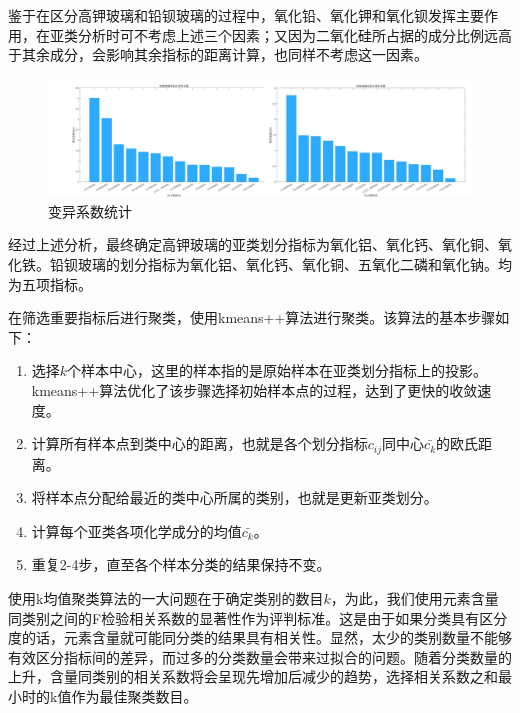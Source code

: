 \documentclass{my_paper}
\begin{document}
鉴于在区分高钾玻璃和铅钡玻璃的过程中，氧化铅、氧化钾和氧化钡发挥主要作用，在亚类分析时可不考虑上述三个因素；又因为二氧化硅所占据的成分比例远高于其余成分，会影响其余指标的距离计算，也同样不考虑这一因素。
\newpage
\begin {figure}[h]
\centering %
\includegraphics[width=\textwidth]{12.jpg}
\caption{变异系数统计} %
\label{cvpr}
\end {figure}
经过上述分析，最终确定高钾玻璃的亚类划分指标为氧化铝、氧化钙、氧化铜、氧化铁。铅钡玻璃的划分指标为氧化铝、氧化钙、氧化铜、五氧化二磷和氧化钠。均为五项指标。

在筛选重要指标后进行聚类，使用kmeans++算法\cite{10}进行聚类。该算法的基本步骤如下：
\begin{enumerate}
  \item 选择$k$个样本中心，这里的样本指的是原始样本在亚类划分指标上的投影。kmeans++算法优化了该步骤选择初始样本点的过程，达到了更快的收敛速度。\cite{11}
  \item 计算所有样本点到类中心的距离，也就是各个划分指标$c_{ij}$同中心$\bar{c_{k}}$的欧氏距离。
  \item 将样本点分配给最近的类中心所属的类别，也就是更新亚类划分。
  \item 计算每个亚类各项化学成分的均值$\bar{c_k}$。
  \item 重复2-4步，直至各个样本分类的结果保持不变。
\end{enumerate}

使用k均值聚类算法的一大问题在于确定类别的数目$k$，为此，我们使用元素含量同类别之间的F检验相关系数\cite{12}的显著性作为评判标准。这是由于如果分类具有区分度的话，元素含量就可能同分类的结果具有相关性。显然，太少的类别数量不能够有效区分指标间的差异，而过多的分类数量会带来过拟合的问题。随着分类数量的上升，含量同类别的相关系数将会呈现先增加后减少的趋势，选择相关系数之和最小时的k值作为最佳聚类数目。
\end{document}
